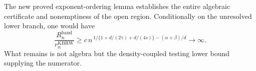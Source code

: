 The new proved exponent-ordering lemma establishes the entire algebraic certificate and nonemptiness of the open region.  Conditionally on the unresolved lower branch, one would have
\[
\frac{R_n^{\mathrm{band}}}{r_n^{\mathrm{KBRW}}}\geq
c\,n^{\,1/\{1+d/(2\gamma)+d/(4s)\}-(\alpha+\beta)/d}\longrightarrow\infty.
\]
What remains is not algebra but the density-coupled testing lower bound supplying the numerator.